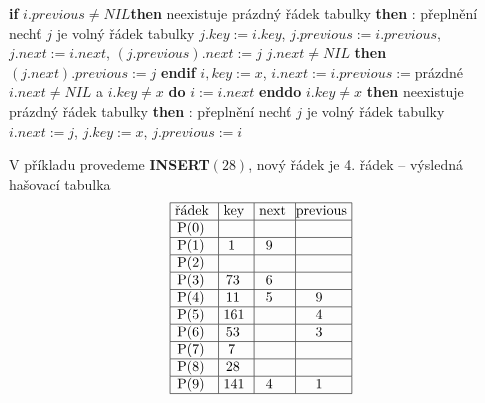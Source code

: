 \documentclass[a4paper,12pt]{article}
\begin{document}
{\bf if} $i.previous\ne NIL${\bf then}\newline 
\phantom{---}{\bf if} neexistuje prázdný řádek tabulky {\bf then}\newline 
\phantom{------}{\bf Výstup}: přeplnění\newline 
\phantom{---}{\bf else}\newline 
\phantom{------}nechť $j$ je volný řádek tabulky\newline 
\phantom{------}$j.key:=i.key$, $j.previous:=i.previous$, $j.next:=i.next$, $(j.previous).next:=j$\newline 
\phantom{------}{\bf if} $j.next\ne NIL$ {\bf then} $(j.next).previous:=j$ {\bf endif}\newline 
\phantom{---------}$i,key:=x$, $i.next:=i.previous:=$prázdné\newline 
\phantom{------}{\bf endif}\newline 
\phantom{---}{\bf endif\newline 
else}\newline 
\phantom{---}{\bf while} $i.next\ne NIL$ a $i.key\ne x$ {\bf do} $i:=i.next$ {\bf enddo}\newline 
\phantom{---}{\bf if} $i.key\ne x$ {\bf then}\newline 
\phantom{------}{\bf if} neexistuje prázdný řádek tabulky {\bf then}\newline 
\phantom{---------}{\bf Výstup}: přeplnění\newline 
\phantom{------}{\bf else}\newline 
\phantom{---------}nechť $j$ je volný řádek tabulky\newline 
\phantom{---------}$i.next:=j$, $j.key:=x$, $j.previous:=i$\newline 
\phantom{------}{\bf endif}\newline 
\phantom{---}{\bf endif\newline
endif}


V příkladu provedeme {\bf INSERT$(28)$}, nový řádek je 4. řádek\newline 
-- výsledná hašovací tabulka
$$\vtop{\offinterlineskip\halign {\strut\vrule\ # & \vrule\ # & \vrule\ # & \vrule \hfil # \hfil \vrule\cr\noalign{\hrule}řádek & key & next & previous\hfil \cr\noalign{\hrule}P(0) & & &\hfill \cr\noalign{\hrule}P(1) & 1 & 9 &\hfill \cr\noalign{\hrule}P(2) & & &\hfill \cr\noalign{\hrule}P(3) & 73 & 6 &\hfill \cr\noalign{\hrule}P(4) & 11 & 5 & 9 \cr\noalign{\hrule}P(5) & 161 & & 4 \cr\noalign{\hrule}P(6) & 53 & & 3 \cr\noalign{\hrule}P(7) & 7 & &\hfill \cr\noalign{\hrule}P(8) & 28 &  &\hfill  \cr\noalign{\hrule}P(9) & 141 & 4 & 1 \cr\noalign{\hrule}}}$$
\end{document}
